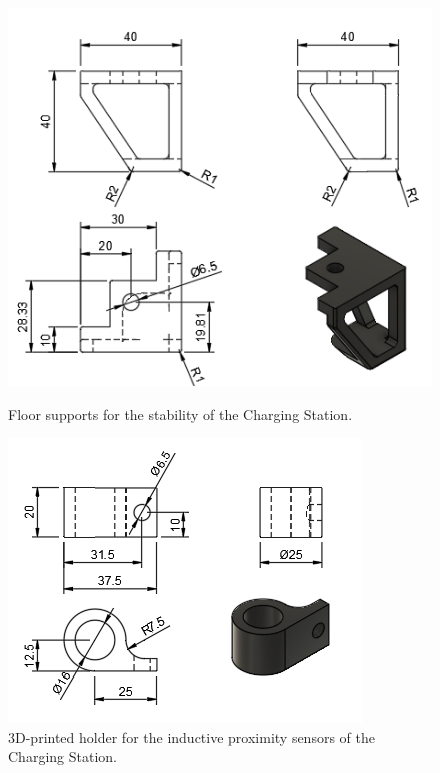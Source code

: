 \begin{figure}[H]
    \centering
    \begin{minipage}{0.45\textwidth}
        \centering
        \includegraphics[width=\textwidth]{PLANOS/PLANO_PATAS_ESTABILIDAD_CAJON.png}
        \caption{Floor supports for the stability of the Charging Station.}
        \label{fig:imagen1}
    \end{minipage}%
    \hfill
    \begin{minipage}{0.45\textwidth}
        \centering
        \includegraphics[width=\textwidth]{PLANOS/PLANO_SENSOR.png}
        \caption{3D-printed holder for the inductive proximity sensors of the Charging Station.}
        \label{fig:imagen2}
    \end{minipage}%
    \hfill
\end{figure}


